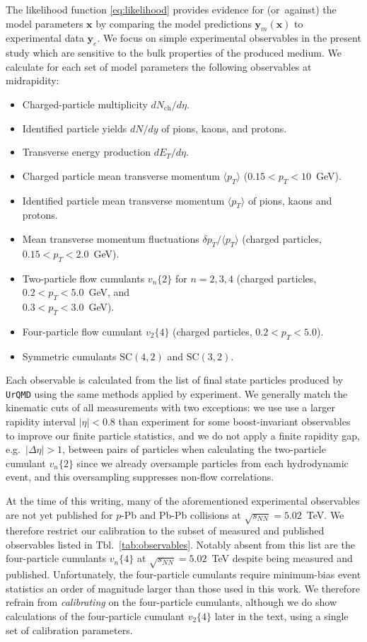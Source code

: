 \documentclass[aps,prc,reprint,amsmath,nofootinbib]{revtex4-1}
\newcommand{\sqrts}{\sqrt{s_{NN}}}
\newcommand{\nch}{N_\text{ch}}
\newcommand{\x}{\mathbf{x}}
\newcommand{\y}{\mathbf{y}}
\newcommand{\vnk}[2]{v_#1\{#2\}}
\def\\#1{ #1}
\begin{document}
The likelihood function \eqref{eq:likelihood} provides evidence for \mbox{(or against)} the model parameters $\x$ by comparing the model predictions $\y_m(\x)$ to experimental data $\y_e$.
We focus on simple experimental observables in the present study which are sensitive to the bulk properties of the produced medium.
We calculate for each set of model parameters the following observables at midrapidity:
\begin{itemize}[leftmargin=1\parindent, itemsep=0pt]
  \item Charged-particle multiplicity $d\nch/d\eta$.
  \item Identified particle yields $dN/dy$ of pions, kaons, and protons.
  \item Transverse energy production $dE_T/d\eta$.
  \item Charged particle mean transverse momentum $\langle p_T \rangle$ ($0.15 < p_T < 10$~GeV).
  \item Identified particle mean transverse momentum $\langle p_T \rangle$ of pions, kaons and protons.
  \item Mean transverse momentum fluctuations $\delta p_T / \langle p_T \rangle$ (charged particles, $0.15 < p_T < 2.0$~GeV).
  \item Two-particle flow cumulants $\vnk{n}{2}$ for $n=2,3,4$\\ (charged particles, $0.2 < p_T < 5.0$~GeV, and \\$0.3 < p_T < 3.0$~GeV).
  \item Four-particle flow cumulant $\vnk{2}{4}$ \\(charged particles, $0.2 < p_T < 5.0$).
  \item Symmetric cumulants $\mathrm{SC}(4, 2)$ and $\mathrm{SC}(3,2)$.
\end{itemize}
Each observable is calculated from the list of final state particles produced by \texttt{UrQMD} using the same methods applied by experiment.
We generally match the kinematic cuts of all measurements with two exceptions: we use use a larger rapidity interval $|\eta| < 0.8$ than experiment for some boost-invariant observables to improve our finite particle statistics, and we do not apply a finite rapidity gap, e.g.\ $|\Delta \eta| > 1$, between pairs of particles when calculating the two-particle cumulant $\vnk{n}{2}$ since we already oversample particles from each hydrodynamic event, and this oversampling suppresses non-flow correlations.

At the time of this writing, many of the aforementioned experimental observables are not yet published for $p$-Pb and Pb-Pb collisions at $\sqrts=5.02$~TeV.
We therefore restrict our calibration to the subset of measured and published observables listed in Tbl.~\ref{tab:observables}.
Notably absent from this list are the four-particle cumulants $\vnk{n}{4}$ at $\sqrts=5.02$~TeV despite being measured and published.
Unfortunately, the four-particle cumulants require minimum-bias event statistics an order of magnitude larger than those used in this work.
We therefore refrain from \emph{calibrating} on the four-particle cumulants, although we do show calculations of the four-particle cumulant $\vnk{2}{4}$ later in the text, using a single set of calibration parameters.
\end{document}
